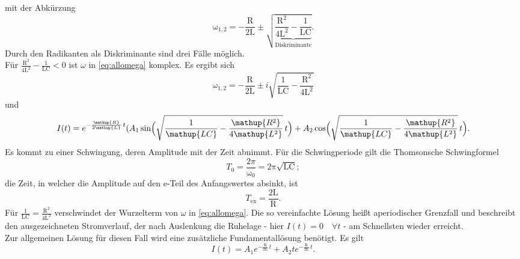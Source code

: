 mit der Abkürzung
\begin{equation}
	\mathup{\omega_{1,2}}= -\frac{\mathup{R}}{2\mathup{L}}\pm\sqrt{\underbrace{\frac{\mathup{R^2}}{4\mathup{L^2}}-\frac{1}{\mathup{LC}}}_{\text{Diskriminante}}}.
	\label{eq:allomega}
\end{equation}
Durch den Radikanten als Diskriminante sind drei Fälle möglich.\\
Für $\frac{\mathup{R^2}}{4\mathup{L^2}}-\frac{1}{\mathup{LC}}<0$ ist $\omega$ in \eqref{eq:allomega} komplex.
Es ergibt sich
\begin{equation}
	\mathup{\omega_{1,2}}= -\frac{\mathup{R}}{2\mathup{L}}\pm i\sqrt{\frac{1}{\mathup{LC}}-\frac{\mathup{R^2}}{4\mathup{L^2}}}
\end{equation}
und
\begin{equation}
	I(t) = e^{-\frac{\mathup{R}}{2\mathup{L}}\,t}(A_1 \sin\Bigl(\sqrt{\frac{1}{\mathup{LC}}-\frac{\mathup{R^2}}{4\mathup{L^2}}}\, t\Bigr)+A_2 \cos\Bigl(\sqrt{\frac{1}{\mathup{LC}}-\frac{\mathup{R^2}}{4\mathup{L^2}}}\,t\Bigr).
	\label{eq:schwingloesung}
\end{equation}
Es kommt zu einer Schwingung, deren Amplitude mit der Zeit abnimmt. 
Für die Schwingperiode gilt die Thomsonsche Schwingformel
\begin{equation}
	T_0 = \frac{2π}{\mathup{ω_0}} = \mathup{2π \sqrt{LC}};
	\label{eq:thomson}
\end{equation} 
die Zeit, in welcher die Amplitude auf den e-Teil des Anfangswertes absinkt, ist
\begin{equation}
	T_\text{ex} = \frac{\text{2L}}{\text{R}}.
	\label{eq:abkling}
\end{equation}
Für $\frac{1}{\mathup{LC}}=\frac{\mathup{R^2}}{4\mathup{L^2}}$ 
verschwindet der Wurzelterm von $\omega$ in \eqref{eq:allomega}.
Die so vereinfachte Lösung heißt aperiodischer Grenzfall und beschreibt den ausgezeichneten Stromverlauf, der nach Auslenkung die Ruhelage - hier $I(t)=0 \quad\forall t$ - am Schnellsten wieder erreicht.\\
Zur allgemeinen Lösung für diesen Fall wird eine zusätzliche Fundamentallösung benötigt.
Es gilt
\begin{equation}
	I(t) = A_1 e^{-\frac{\mathup{R}}{2\mathup{L}}\,t}+A_2 t e^{-\frac{\mathup{R}}{2\mathup{L}}\,t}.
\end{equation}

